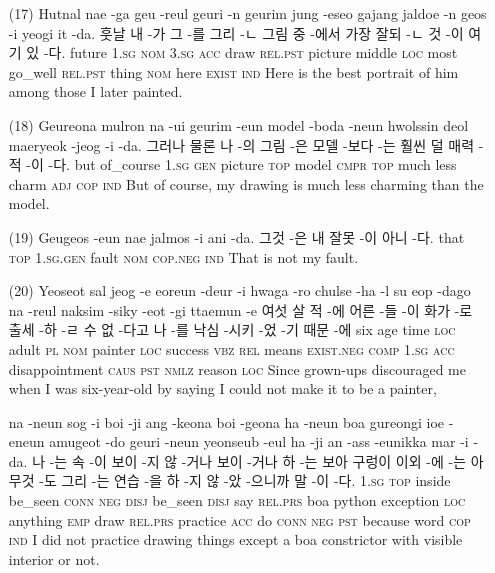\begin{itemize}
\item [(17)]
\tgl
		{Hutnal nae -ga geu -reul geuri -n geurim jung -eseo gajang jaldoe -n geos -i yeogi it -da.}
		{훗날 내 -가 그 -를 그리 -ㄴ 그림 중 -에서 가장 잘되 -ㄴ 것 -이 여기 있 -다.}
		{future	\textsc{1.sg}	\textsc{nom}	\textsc{3.sg}	\textsc{acc}	draw	\textsc{rel.pst}	picture	middle	\textsc{loc}	most	go\_well	\textsc{rel.pst}	thing	\textsc{nom}	here	\textsc{exist}	\textsc{ind}}
		{Here is the best portrait of him among those I later painted.}
		
\item [(18)]
\tgl
		{Geureona mulron na -ui geurim -eun model -boda -neun hwolssin deol maeryeok -jeog -i -da.}
		{그러나 물론 나 -의 그림 -은 모델 -보다 -는 훨씬 덜 매력 -적 -이 -다.}
		{but	of\_course	\textsc{1.sg}	\textsc{gen}	picture	\textsc{top}	model	\textsc{cmpr}	\textsc{top}	much	less	charm	\textsc{adj}	\textsc{cop}	\textsc{ind}}
		{But of course, my drawing is much less charming than the model.}
		
\item [(19)]
\tgl
		{Geugeos -eun nae jalmos -i ani -da.}
		{그것 -은 내 잘못 -이 아니 -다.}
		{that	\textsc{top}	\textsc{1.sg.gen}	fault	\textsc{nom}	\textsc{cop.neg}	\textsc{ind}}
		{That is not my fault.}
		
\item [(20)]
\tgl
		{Yeoseot sal jeog -e eoreun -deur -i hwaga -ro chulse -ha -l su eop -dago na -reul naksim -siky -eot -gi ttaemun -e}
		{여섯 살 적 -에 어른 -들 -이 화가 -로 출세 -하 -ㄹ 수 없 -다고 나 -를 낙심 -시키 -었 -기 때문 -에}
		{six	age	time	\textsc{loc}	adult	\textsc{pl}	\textsc{nom}	painter	\textsc{loc}	success	\textsc{vbz}	\textsc{rel}	means	\textsc{exist.neg}	\textsc{comp}	\textsc{1.sg}	\textsc{acc}	disappointment	\textsc{caus}	\textsc{pst}	\textsc{nmlz}	reason	\textsc{loc}}
		{Since grown-ups discouraged me when I was six-year-old by saying I could not make it to be a painter,}
		
\tgl
		{na -neun sog -i boi -ji ang -keona boi -geona ha -neun boa gureongi ioe -eneun amugeot -do geuri -neun yeonseub -eul ha -ji an -ass -eunikka mar -i -da.}
		{나 -는 속 -이 보이 -지 않 -거나 보이 -거나 하 -는 보아 구렁이 이외 -에 -는 아무것 -도 그리 -는 연습 -을 하 -지 않 -았 -으니까 말 -이 -다.}
		{\textsc{1.sg}	\textsc{top}	inside	be\_seen	\textsc{conn}	\textsc{neg}	\textsc{disj}	be\_seen	\textsc{disj}	say	\textsc{rel.prs}	boa	python	exception	\textsc{loc}	anything	\textsc{emp}	draw	\textsc{rel.prs}	practice	\textsc{acc}	do	\textsc{conn}	\textsc{neg}	\textsc{pst}	because	word	\textsc{cop}	\textsc{ind}}
		{I did not practice drawing things except a boa constrictor with visible interior or not.}
		

\end{itemize}
